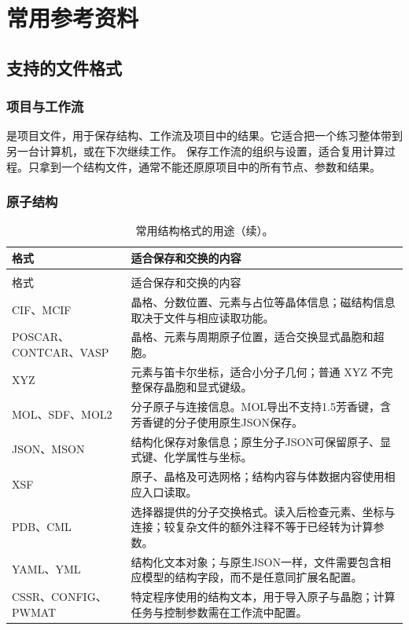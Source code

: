 \chapter{常用参考资料}\label{ch:reference}


\section{支持的文件格式}

\subsection{项目与工作流}

 是项目文件，用于保存结构、工作流及项目中的结果。它适合把一个练习整体带到另一台计算机，或在下次继续工作。 保存工作流的组织与设置，适合复用计算过程。只拿到一个结构文件，通常不能还原原项目中的所有节点、参数和结果。

\Needspace{38mm}
\subsection{原子结构}

\begin{longtable}{>{\raggedright\arraybackslash}p{.34\linewidth}>{\raggedright\arraybackslash}p{}}
\caption{常用结构格式的用途。}\\
\toprule
格式 & 适合保存和交换的内容 \\
\midrule
\endfirsthead
\caption[]{常用结构格式的用途（续）。}\\
\toprule
格式 & 适合保存和交换的内容 \\
\midrule
\endhead
\bottomrule
\endfoot
\bottomrule
\endlastfoot
CIF、MCIF & 晶格、分数位置、元素与占位等晶体信息；磁结构信息取决于文件与相应读取功能。\\
POSCAR、CONTCAR、VASP & 晶格、元素与周期原子位置，适合交换显式晶胞和超胞。\\
XYZ & 元素与笛卡尔坐标，适合小分子几何；普通 XYZ 不完整保存晶胞和显式键级。\\
MOL、SDF、MOL2 & 分子原子与连接信息。MOL导出不支持1.5芳香键，含芳香键的分子使用原生JSON保存。\\
JSON、MSON & 结构化保存对象信息；原生分子JSON可保留原子、显式键、化学属性与坐标。\\
XSF & 原子、晶格及可选网格；结构内容与体数据内容使用相应入口读取。\\
PDB、CML & 选择器提供的分子交换格式。读入后检查元素、坐标与连接；较复杂文件的额外注释不等于已经转为计算参数。\\
YAML、YML & 结构化文本对象；与原生JSON一样，文件需要包含相应模型的结构字段，而不是任意同扩展名配置。\\
CSSR、CONFIG、PWMAT & 特定程序使用的结构文本，用于导入原子与晶胞；计算任务与控制参数需在工作流中配置。\\
\end{longtable}

